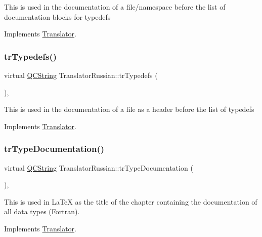 This is used in the documentation of a file/namespace before the list of documentation blocks for typedefs 

Implements \mbox{\hyperlink{class_translator}{Translator}}.

\mbox{\label{class_translator_russian_a1b188dc3e426ac0fc043936f77816e68}} 
\subsubsection{\texorpdfstring{trTypedefs()}{trTypedefs()}}
{\footnotesize\ttfamily virtual \mbox{\hyperlink{class_q_c_string}{Q\+C\+String}} Translator\+Russian\+::tr\+Typedefs (\begin{DoxyParamCaption}{ }\end{DoxyParamCaption})\hspace{0.3cm}{\ttfamily [inline]}, {\ttfamily [virtual]}}

This is used in the documentation of a file as a header before the list of typedefs 

Implements \mbox{\hyperlink{class_translator}{Translator}}.

\mbox{\label{class_translator_russian_ad7a6d458ee96ad01cdbfb292a263f398}} 
\subsubsection{\texorpdfstring{trTypeDocumentation()}{trTypeDocumentation()}}
{\footnotesize\ttfamily virtual \mbox{\hyperlink{class_q_c_string}{Q\+C\+String}} Translator\+Russian\+::tr\+Type\+Documentation (\begin{DoxyParamCaption}{ }\end{DoxyParamCaption})\hspace{0.3cm}{\ttfamily [inline]}, {\ttfamily [virtual]}}

This is used in La\+TeX as the title of the chapter containing the documentation of all data types (Fortran). 

Implements \mbox{\hyperlink{class_translator}{Translator}}.

\mbox{\label{class_translator_russian_a98929883538036cd45c3deef8486123f}} 
